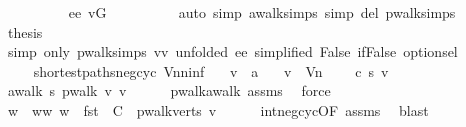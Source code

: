 \begin{isabellebody}
\ \ \ \ \ \ \ \ \isamarkupfalse%
\ ee{\isacharparenleft}{}{\isacharminus}{}{\isacharparenright}\ vG\isanewline
\ \ \ \ \ \ \ \ \isamarkupfalse%
\ {\isacharparenleft}auto\ simp{\isacharcolon}\ awalk{\isacharunderscore}simps\ simp\ del{\isacharcolon}\ pwalk{\isachardot}simps{\isacharparenright}\isanewline
\ \ \ \ \ \ \isamarkupfalse%
\ {\isacharquery}thesis\ \isanewline
\ \ \ \ \ \ \ \ \isamarkupfalse%
\ {\isacharparenleft}simp\ only{\isacharcolon}\ pwalk{\isachardot}simps{\isacharbrackleft}\ v{\isacharequal}v{\isacharcomma}\ unfolded\ ee{\isacharparenleft}{}{\isacharparenright}{\isacharcomma}\ simplified\ False\ if{\isacharunderscore}False\ option{\isachardot}sel{\isacharbrackright}{\isacharparenright}\isanewline
\ \ \ \ \isamarkupfalse%
\isanewline
\ \ \isamarkupfalse%
\isanewline
{}\isamarkupfalse%
%
\endisatagproof
{\isafoldproof}%
%
\isadelimproof
\isanewline
%
\endisadelimproof
\isanewline
{}\isamarkupfalse%
\ {\isacharparenleft}\ shortest{\isacharunderscore}paths{\isacharunderscore}neg{\isacharunderscore}cyc{\isacharparenright}\ Vn{\isacharunderscore}{\isasymmu}{\isacharunderscore}ninf{\isacharcolon}\isanewline
\ \ \ v\ {\isacharcolon}{\isacharcolon}\ {\isacharprime}a\isanewline
\ \ \ {\isachardoublequoteopen}v\ {\isasymin}\ V\isactrlsub n{\isachardoublequoteclose}\isanewline
\ \ \ {\isachardoublequoteopen}{\isasymmu}\ c\ s\ v\ {\isacharequal}\ {\isacharminus}\ {\isasyminfinity}{\isachardoublequoteclose}\isanewline
%
\isadelimproof
%
\endisadelimproof
%
\isatagproof
{}\isamarkupfalse%
\ {\isacharminus}\isanewline
\ \ \isamarkupfalse%
\ {\isachardoublequoteopen}awalk\ s\ {\isacharparenleft}pwalk\ v{\isacharparenright}\ v{\isachardoublequoteclose}\isanewline
\ \ \ \ \isamarkupfalse%
\ pwalk{\isacharunderscore}awalk\ assms\ \isamarkupfalse%
\ force\isanewline
{}\isamarkupfalse%
\isanewline
\ \ \isamarkupfalse%
\ w\ \ ww{\isacharcolon}\ {\isachardoublequoteopen}w\ {\isasymin}\ fst\ {\isacharbackquote}\ C\ {\isasyminter}\ pwalk{\isacharunderscore}verts\ v{\isachardoublequoteclose}\isanewline
\ \ \ \ \isamarkupfalse%
\ int{\isacharunderscore}neg{\isacharunderscore}cyc{\isacharbrackleft}OF\ assms{\isacharbrackright}\ \isamarkupfalse%
\ blast\isanewline
\ \ \isamarkupfalse%

\end{isabellebody}
